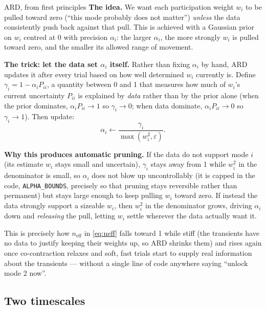 \documentclass[11pt,a4paper]{article}
\newcommand{\neff}{n_{\mathrm{eff}}}
\begin{document}
\begin{techbox}{ARD, from first principles}
\textbf{The idea.} We want each participation weight $w_i$ to be pulled toward
zero (``this mode probably does not matter'') \emph{unless} the data
consistently push back against that pull. This is achieved with a Gaussian
prior on $w_i$ centred at $0$ with precision $\alpha_i$: the larger $\alpha_i$,
the more strongly $w_i$ is pulled toward zero, and the smaller its allowed
range of movement.

\textbf{The trick: let the data set $\alpha_i$ itself.} Rather than fixing
$\alpha_i$ by hand, ARD updates it after every trial based on how well
determined $w_i$ currently is. Define $\gamma_i=1-\alpha_i P_{ii}$, a quantity
between 0 and 1 that measures how much of $w_i$'s current uncertainty $P_{ii}$
is explained by \emph{data} rather than by the prior alone (when the prior
dominates, $\alpha_iP_{ii}\to1$ so $\gamma_i\to0$; when data dominate,
$\alpha_iP_{ii}\to0$ so $\gamma_i\to1$). Then update:
\begin{equation}
\alpha_i \leftarrow \frac{\gamma_i}{\max(w_i^2,\varepsilon)}.
\label{eq:ard}
\end{equation}

\textbf{Why this produces automatic pruning.} If the data do not support mode
$i$ (its estimate $w_i$ stays small and uncertain), $\gamma_i$ stays away from
1 while $w_i^2$ in the denominator is small, so $\alpha_i$ does not blow up
uncontrollably (it is capped in the code, \texttt{ALPHA\_BOUNDS}, precisely so
that pruning stays reversible rather than permanent) but stays large enough to
keep pulling $w_i$ toward zero. If instead the data strongly support a
sizeable $w_i$, then $w_i^2$ in the denominator grows, driving $\alpha_i$ down
and \emph{releasing} the pull, letting $w_i$ settle wherever the data actually
want it.
\end{techbox}

This is precisely how $\neff$ in \eqref{eq:neff} falls toward 1 while stiff
(the transients have no data to justify keeping their weights up, so ARD
shrinks them) and rises again once co-contraction relaxes and soft, fast
trials start to supply real information about the transients --- without a
single line of code anywhere saying ``unlock mode 2 now''.

\subsection{Two timescales}
\end{document}

